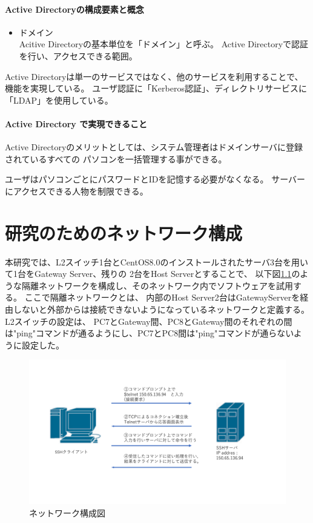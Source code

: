 \documentclass[11pt,a4j,titlepage]{jreport}
\begin{document}

\subsubsection*{Active Directoryの構成要素と概念}

\begin{itemize}
    \item ドメイン\mbox{}\\
    Acitive Directoryの基本単位を「ドメイン」と呼ぶ。
    Active Directoryで認証を行い、アクセスできる範囲。

\end{itemize}
Active Directoryは単一のサービスではなく、他のサービスを利用することで、機能を実現している。
ユーザ認証に「Kerberos認証」、ディレクトリサービスに「LDAP」を使用している。


\subsubsection*{Active Directory で実現できること}
Active Directoryのメリットとしては、システム管理者はドメインサーバに登録されているすべての
パソコンを一括管理する事ができる。

ユーザはパソコンごとにパスワードとIDを記憶する必要がなくなる。
サーバーにアクセスできる人物を制限できる。


\fi


\chapter{研究のためのネットワーク構成}
本研究では、L2スイッチ1台とCentOS8.0のインストールされたサーバ3台を用いて1台をGateway Server、残りの
2台をHost Serverとすることで、
以下図\ref{network_graph}のような隔離ネットワークを構成し、そのネットワーク内でソフトウェアを試用する。
ここで隔離ネットワークとは、
内部のHost Server2台はGatewayServerを経由しないと外部からは接続できないようになっているネットワークと定義する。
L2スイッチの設定は、
PC7とGateway間、PC8とGateway間のそれぞれの間は"ping"コマンドが通るようにし、PC7とPC8間は"ping"コマンドが通らないように設定した。

\begin{figure}[H]
    \centering
    \includegraphics*[width=1.0\textwidth,page=2]{graphs/network_archtecture.pdf}
    \caption{ネットワーク構成図}
    \label{network_graph}
\end{figure}
\end{document}
